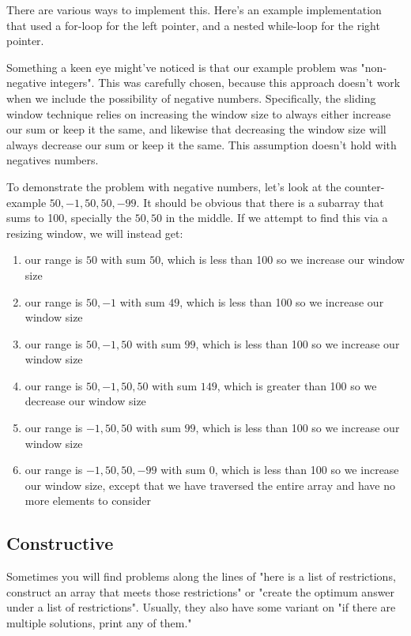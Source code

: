 There are various ways to implement this. Here's an example implementation that used a for-loop for the left pointer, and a nested while-loop for the right pointer.


Something a keen eye might've noticed is that our example problem was "non-negative integers". This was carefully chosen, because this approach doesn't work when we include the possibility of negative numbers. Specifically, the sliding window technique relies on increasing the window size to always either increase our sum or keep it the same, and likewise that decreasing the window size will always decrease our sum or keep it the same. This assumption doesn't hold with negatives numbers.

To demonstrate the problem with negative numbers, let's look at the counter-example $50, -1, 50, 50, -99$. It should be obvious that there is a subarray that sums to 100, specially the $50,50$ in the middle. If we attempt to find this via a resizing window, we will instead get:
\begin{enumerate}
\item our range is $50$ with sum $50$, which is less than 100 so we increase our window size
\item our range is $50,-1$ with sum $49$, which is less than 100 so we increase our window size
\item our range is $50,-1,50$ with sum $99$, which is less than 100 so we increase our window size
\item our range is $50,-1,50,50$ with sum $149$, which is greater than 100 so we decrease our window size
\item our range is $-1,50,50$ with sum $99$, which is less than 100 so we increase our window size
\item our range is $-1,50,50,-99$ with sum $0$, which is less than 100 so we increase our window size, except that we have traversed the entire array and have no more elements to consider
\end{enumerate}

\subsection{Constructive}

Sometimes you will find problems along the lines of "here is a list of restrictions, construct an array that meets those restrictions" or "create the optimum answer under a list of restrictions". Usually, they also have some variant on "if there are multiple solutions, print any of them."

